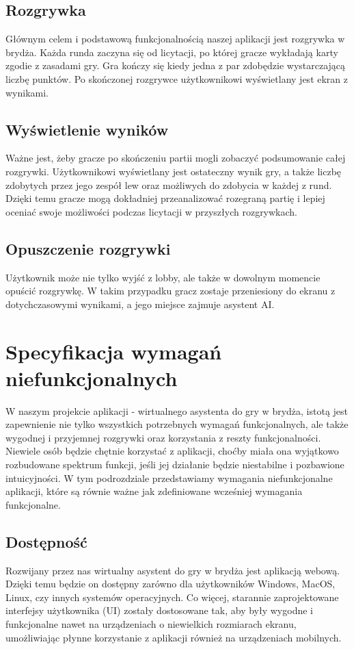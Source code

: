 \subsection{Rozgrywka}
Głównym celem i podstawową funkcjonalnością naszej aplikacji jest rozgrywka w brydża. Każda runda zaczyna się od licytacji, po której gracze wykładają karty zgodie z zasadami gry. Gra kończy się kiedy jedna z par zdobędzie wystarczającą liczbę punktów. Po skończonej rozgrywce użytkownikowi wyświetlany jest ekran z wynikami.
\subsection{Wyświetlenie wyników}
Ważne jest, żeby gracze po skończeniu partii mogli zobaczyć podsumowanie całej rozgrywki. Użytkownikowi wyświetlany jest ostateczny wynik gry, a także liczbę zdobytych przez jego zespół lew oraz możliwych do zdobycia w każdej z rund. Dzięki temu gracze mogą dokładniej przeanalizować rozegraną partię i lepiej oceniać swoje możliwości podczas licytacji w przyszłych rozgrywkach. 
\subsection{Opuszczenie rozgrywki}
Użytkownik może nie tylko wyjść z lobby, ale także w dowolnym momencie opuścić rozgrywkę. W takim przypadku gracz zostaje przeniesiony do ekranu z dotychczasowymi wynikami, a jego miejsce zajmuje asystent AI.

\section{Specyfikacja wymagań niefunkcjonalnych}
W naszym projekcie aplikacji - wirtualnego asystenta do gry w brydża, istotą jest zapewnienie nie tylko wszystkich potrzebnych wymagań funkcjonalnych, ale także wygodnej i przyjemnej rozgrywki oraz korzystania z reszty funkcjonalności. Niewiele osób będzie chętnie korzystać z aplikacji, choćby miała ona wyjątkowo rozbudowane spektrum funkcji, jeśli jej działanie będzie niestabilne i pozbawione intuicyjności. W tym podrozdziale przedstawiamy wymagania niefunkcjonalne aplikacji, które są równie ważne jak zdefiniowane wcześniej wymagania funkcjonalne.
\subsection{Dostępność}
Rozwijany przez nas wirtualny asystent do gry w brydża jest aplikacją webową. Dzięki temu będzie on dostępny zarówno dla użytkowników Windows, MacOS, Linux, czy innych systemów operacyjnych. Co więcej, starannie zaprojektowane interfejsy użytkownika (UI) zostały dostosowane tak, aby były wygodne i funkcjonalne nawet na urządzeniach o niewielkich rozmiarach ekranu, umożliwiając płynne korzystanie z aplikacji również na urządzeniach mobilnych.
